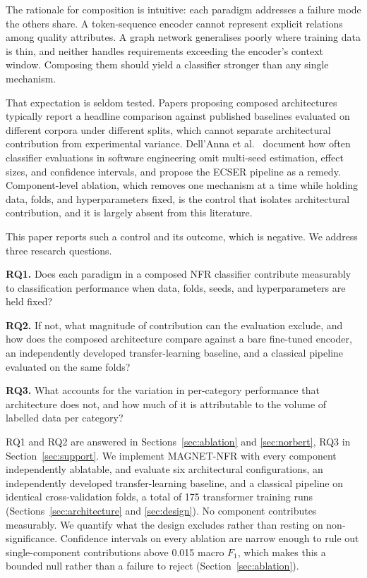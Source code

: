 \documentclass[11pt,a4paper]{article}
\begin{document}
The rationale for composition is intuitive: each paradigm addresses a failure mode the
others share. A token-sequence encoder cannot represent explicit relations among quality attributes. A graph network generalises poorly where training data is thin, and neither handles requirements exceeding the encoder's context window. Composing them should yield
a classifier stronger than any single mechanism.

That expectation is seldom tested. Papers proposing composed architectures typically
report a headline comparison against published baselines evaluated on different corpora
under different splits, which cannot separate architectural contribution from
experimental variance. Dell'Anna et al.~\cite{dellanna2023} document how often classifier
evaluations in software engineering omit multi-seed estimation, effect sizes, and
confidence intervals, and propose the ECSER pipeline as a remedy. Component-level
ablation, which removes one mechanism at a time while holding data, folds, and
hyperparameters fixed, is the control that isolates architectural contribution, and it
is largely absent from this literature.

This paper reports such a control and its outcome, which is negative. We address three
research questions.

\textbf{RQ1.} Does each paradigm in a composed NFR classifier contribute measurably to
classification performance when data, folds, seeds, and hyperparameters are held fixed?

\textbf{RQ2.} If not, what magnitude of contribution can the evaluation exclude, and how
does the composed architecture compare against a bare fine-tuned encoder, an independently
developed transfer-learning baseline, and a classical pipeline evaluated on the same folds?

\textbf{RQ3.} What accounts for the variation in per-category performance that architecture
does not, and how much of it is attributable to the volume of labelled data per category?

RQ1 and RQ2 are answered in Sections~\ref{sec:ablation} and \ref{sec:norbert}, RQ3 in
Section~\ref{sec:support}. We implement
MAGNET-NFR with every component independently ablatable, and evaluate six architectural
configurations, an independently developed transfer-learning baseline, and a classical
pipeline on identical cross-validation folds, a total of 175 transformer training runs
(Sections~\ref{sec:architecture} and \ref{sec:design}). No component contributes
measurably. We quantify what the design excludes rather than resting on non-significance. Confidence intervals on every ablation are narrow enough to rule out single-component contributions above 0.015 macro $F_1$, which makes this a bounded null rather than
a failure to reject (Section~\ref{sec:ablation}).
\end{document}
